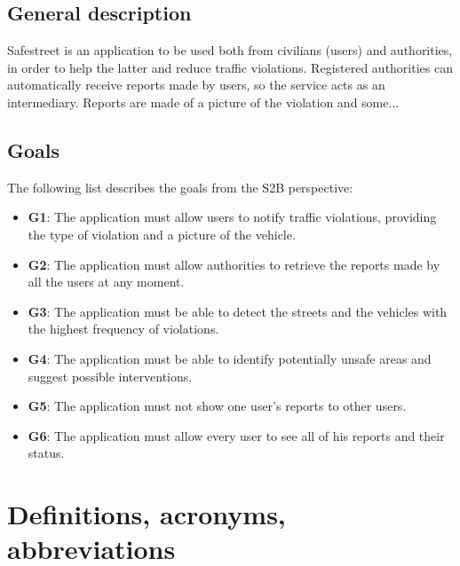 \documentclass[12pt,a4paper]{report}
\begin{document}
	\subsection{General description}
Safestreet is an application to be used both from civilians (users) and authorities, in order to help the latter and reduce traffic violations. Registered authorities can automatically receive reports made by users, so the service acts as an intermediary. Reports are made of a picture of the violation and some... 
	\subsection{Goals}
	The following list describes the goals from the S2B perspective:
	
	\begin{itemize}
		\item \textbf{G1}: The application must allow users to notify traffic violations, providing  the type of violation and a picture of the vehicle.
	  	\item \textbf{G2}: The application must allow authorities to retrieve the reports made by all the users at any moment.
		\item \textbf{G3}: The application must be able to detect the streets and the vehicles with the highest frequency of violations.
		\item \textbf{G4}: The application must be able to identify potentially unsafe areas and suggest possible interventions.
		\item \textbf{G5}: The application must not show one user's reports to other users.
		\item \textbf{G6}: The application must allow every user to see all of his reports and their status.
	\end{itemize}

	\section{Definitions, acronyms, abbreviations}
\end{document}
